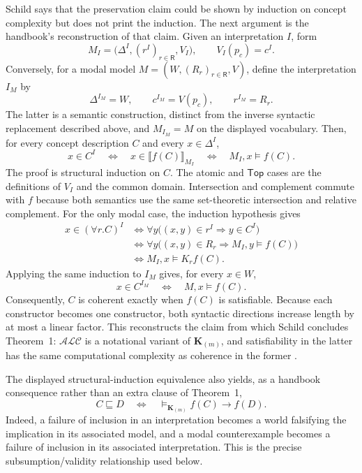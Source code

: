 Schild says that the preservation claim could be shown by induction on concept
complexity but does not print the induction.  The next argument is the
handbook's reconstruction of that claim.  Given an interpretation \(I\), form
\[
 M_I=
 \bigl(\Delta^I,(r^I)_{r\in\mathsf R},V_I\bigr),
 \qquad V_I(p_c)=c^I.
\]
Conversely, for a modal model
\(M=(W,(R_r)_{r\in\mathsf R},V)\), define the interpretation \(I_M\) by
\[
 \Delta^{I_M}=W,
 \qquad
 c^{I_M}=V(p_c),
 \qquad
 r^{I_M}=R_r.
\]
The latter is a semantic construction, distinct from the inverse syntactic
replacement described above, and \(M_{I_M}=M\) on the displayed vocabulary.
Then, for every concept description \(C\) and every
\(x\in\Delta^I\),
\[
 x\in C^I
 \quad\Longleftrightarrow\quad
 x\in\llbracket f(C)\rrbracket_{M_I}
 \quad\Longleftrightarrow\quad
 M_I,x\models f(C).
\]
The proof is structural induction on \(C\).  The atomic and
\(\mathsf{Top}\) cases are the definitions of \(V_I\) and the common domain.
Intersection and complement commute with \(f\) because both semantics use the
same set-theoretic intersection and relative complement.  For the only modal
case, the induction hypothesis gives
\[
\begin{aligned}
 x\in(\forall r.C)^I
 &\Longleftrightarrow
   \forall y\bigl((x,y)\in r^I\Rightarrow y\in C^I\bigr)\\
 &\Longleftrightarrow
   \forall y\bigl((x,y)\in R_r\Rightarrow
                    M_I,y\models f(C)\bigr)\\
 &\Longleftrightarrow M_I,x\models K_r f(C).
\end{aligned}
\]
Applying the same induction to \(I_M\) gives, for every \(x\in W\),
\[
 x\in C^{I_M}
 \quad\Longleftrightarrow\quad
 M,x\models f(C).
\]
Consequently, \(C\) is coherent exactly when \(f(C)\) is satisfiable.
Because each constructor becomes one constructor, both syntactic directions
increase length by at most a linear factor.  This reconstructs the claim from
which Schild concludes Theorem~1: \(\mathcal{ALC}\) is a notational variant of
\(\mathbf K_{(m)}\), and satisfiability in the latter has the same
computational complexity as coherence in the former
\cite[thm.~1, p.~467]{Schild1991}.

The displayed structural-induction equivalence also yields, as a handbook
consequence rather than an extra clause of Theorem~1,
\[
 C\sqsubseteq D
 \quad\Longleftrightarrow\quad
 \models_{\mathbf K_{(m)}} f(C)\rightarrow f(D).
\]
Indeed, a failure of inclusion in an interpretation becomes a world falsifying
the implication in its associated model, and a modal counterexample becomes a
failure of inclusion in its associated interpretation.  This is the precise
subsumption/validity relationship used below.

